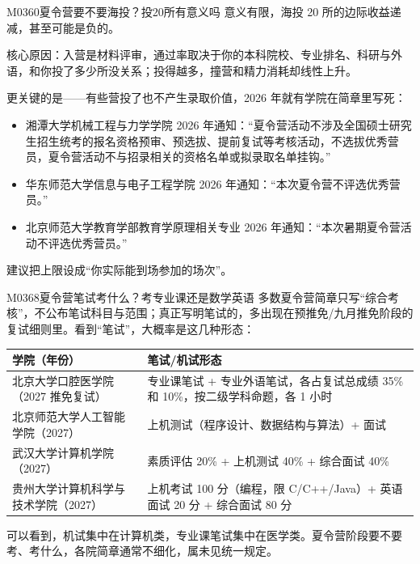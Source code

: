 \begin{qa}{M0360}{夏令营要不要海投？投20所有意义吗}
意义有限，海投 20 所的边际收益递减，甚至可能是负的。

核心原因：入营是材料评审，通过率取决于你的本科院校、专业排名、科研与外语，和你投了多少所没关系；投得越多，撞营和精力消耗却线性上升。

更关键的是——有些营投了也不产生录取价值，2026 年就有学院在简章里写死：
\begin{itemize}
  \item 湘潭大学机械工程与力学学院 2026 年通知：“夏令营活动不涉及全国硕士研究生招生统考的报名资格预审、预选拔、提前复试等考核活动，不选拔优秀营员，夏令营活动不与招录相关的资格名单或拟录取名单挂钩。”
  \item 华东师范大学信息与电子工程学院 2026 年通知：“本次夏令营不评选优秀营员。”
  \item 北京师范大学教育学部教育学原理相关专业 2026 年通知：“本次暑期夏令营活动不评选优秀营员。”
\end{itemize}

建议把上限设成“你实际能到场参加的场次”。
\end{qa}

\begin{qa}{M0368}{夏令营笔试考什么？考专业课还是数学英语}
多数夏令营简章只写“综合考核”，不公布笔试科目与范围；真正写明笔试的，多出现在预推免/九月推免阶段的复试细则里。看到“笔试”，大概率是这几种形态：
\par\vspace{2pt}\nobreak\begin{center}\footnotesize
\begin{tabularx}{\textwidth}{>{\raggedright\arraybackslash}X>{\raggedright\arraybackslash}X}
\toprule
\textbf{学院（年份）} & \textbf{笔试/机试形态} \\ \midrule
北京大学口腔医学院（2027 推免复试） & 专业课笔试 + 专业外语笔试，各占复试总成绩 35\% 和 10\%，按二级学科命题，各 1 小时 \\
北京师范大学人工智能学院（2027） & 上机测试（程序设计、数据结构与算法）+ 面试 \\
武汉大学计算机学院（2027） & 素质评估 20\% + 上机测试 40\% + 综合面试 40\% \\
贵州大学计算机科学与技术学院（2027） & 上机考试 100 分（编程，限 C/C++/Java）+ 英语面试 20 分 + 综合面试 80 分 \\
\bottomrule
\end{tabularx}
\end{center}\vspace{2pt}\par

可以看到，机试集中在计算机类，专业课笔试集中在医学类。夏令营阶段要不要考、考什么，各院简章通常不细化，属未见统一规定。
\end{qa}

